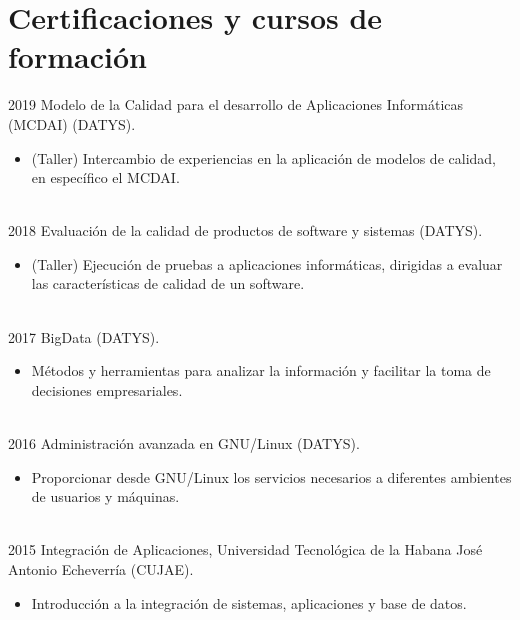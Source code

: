 \documentclass[letterpaper]{twentysecondcv} %
\begin{document}
\section{Certificaciones y cursos de formación}

\begin{twenty} %
\twentyitem
    	{2019}
		{}
        {Modelo de la Calidad para el desarrollo de Aplicaciones Informáticas (MCDAI) (DATYS).}
        {}
        {}
        {
        {\begin{itemize}
        \item (Taller) Intercambio de experiencias en la aplicación de modelos de calidad, en específico el MCDAI.
		\end{itemize}}
        }
        \\
\twentyitem
    	{2018}
		{}
        {Evaluación de la calidad de productos de software y sistemas (DATYS).}
        {}
        {}
        {
        {\begin{itemize}
        \item (Taller) Ejecución de pruebas a aplicaciones informáticas, dirigidas a evaluar las características de calidad de un software.
		\end{itemize}}
        }
        \\
\twentyitem
    	{2017}
		{}
        {BigData (DATYS).}
        {}
        {}
         {
        {\begin{itemize}
        \item Métodos y herramientas para analizar la información y facilitar la toma de decisiones empresariales.
		\end{itemize}}
        }
        \\
\twentyitem
    	{2016}
		{}
        {Administración avanzada en GNU/Linux (DATYS).}
        {}
        {}
        {
        {\begin{itemize}
        \item Proporcionar desde GNU/Linux los servicios necesarios a diferentes ambientes de usuarios y máquinas.
		\end{itemize}}
        }
        \\
\twentyitem
    	{2015}
		{}
        {Integración de Aplicaciones, Universidad Tecnológica de la Habana José Antonio
Echeverría (CUJAE).}
        {}
        {}
        {
        {\begin{itemize}
        \item Introducción a la integración de sistemas, aplicaciones y base de datos.
		\end{itemize}}
}
\end{twenty}
\end{document}
